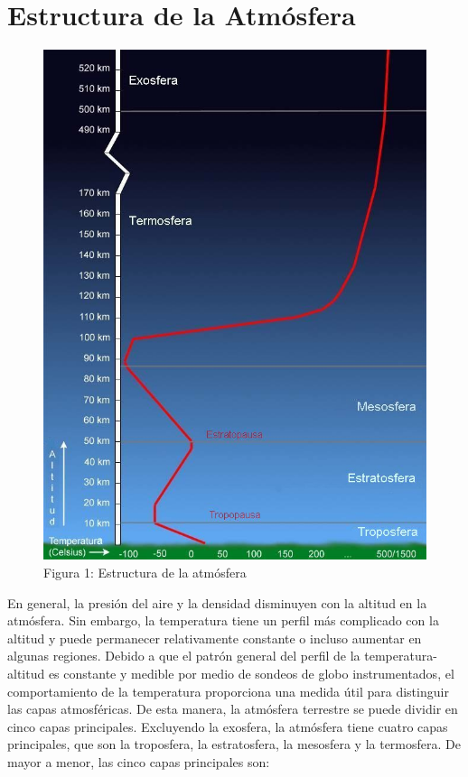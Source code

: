 \documentclass[12pt]{article}
\begin{document}
\section{Estructura de la Atmósfera}

\begin{figure}
  \begin{centering}
  \includegraphics[scale = 0.3]{capesatmosfera.jpg}
  \caption{Figura 1: Estructura de la atmósfera}
  \end{centering}
\end{figure}


En general, la presión del aire y la densidad disminuyen con la altitud en la atmósfera. Sin embargo, la temperatura tiene un perfil más complicado con la altitud y puede permanecer relativamente constante o incluso aumentar en algunas regiones. Debido a que el patrón general del perfil de la temperatura-altitud es constante y medible por medio de sondeos de globo instrumentados, el comportamiento de la temperatura proporciona una medida útil para distinguir las capas atmosféricas. De esta manera, la atmósfera terrestre se puede dividir en cinco capas principales. Excluyendo la exosfera, la atmósfera tiene cuatro capas principales, que son la troposfera, la estratosfera, la mesosfera y la termosfera. De mayor a menor, las cinco capas principales son:
\end{document}
